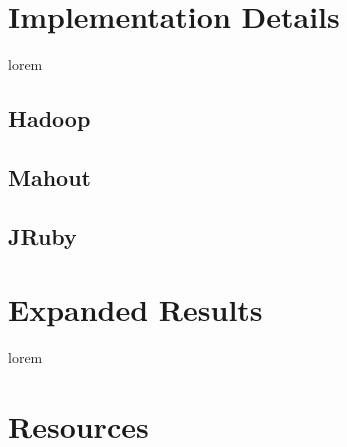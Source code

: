 
\chapter{Implementation Details}
\label{appendix:implementation}

lorem

\section{Hadoop}
\section{Mahout}
\section{JRuby}

\chapter{Expanded Results}

lorem


\chapter{Resources}
\label{appendix:resources}

